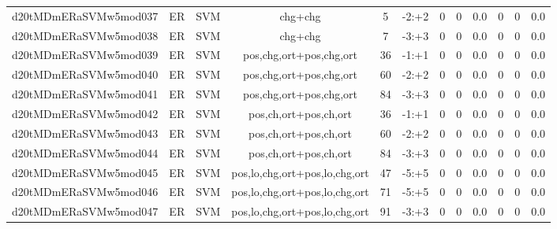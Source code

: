 \documentclass[a4paper]{article}
\begin{document}
\begin{landscape}
\begin{center}
\begin{tabular}{ |c|c|c|c|c|c|c|c|c|c|c|c|}
 
 	
 	\small{ d20tMDmERaSVMw5mod037 } & ER & SVM & chg+chg  &  5 &  -2:+2  &  0 & 0 & 0.0  &  0 & 0 & 0.0 \\
 	

 
 	
 	\small{ d20tMDmERaSVMw5mod038 } & ER & SVM & chg+chg  &  7 &  -3:+3  &  0 & 0 & 0.0  &  0 & 0 & 0.0 \\
 	

 
 	
 	\small{ d20tMDmERaSVMw5mod039 } & ER & SVM & pos,chg,ort+pos,chg,ort  &  36 &  -1:+1  &  0 & 0 & 0.0  &  0 & 0 & 0.0 \\
 	

 
 	
 	\small{ d20tMDmERaSVMw5mod040 } & ER & SVM & pos,chg,ort+pos,chg,ort  &  60 &  -2:+2  &  0 & 0 & 0.0  &  0 & 0 & 0.0 \\
 	

 
 	
 	\small{ d20tMDmERaSVMw5mod041 } & ER & SVM & pos,chg,ort+pos,chg,ort  &  84 &  -3:+3  &  0 & 0 & 0.0  &  0 & 0 & 0.0 \\
 	

 
 	
 	\small{ d20tMDmERaSVMw5mod042 } & ER & SVM & pos,ch,ort+pos,ch,ort  &  36 &  -1:+1  &  0 & 0 & 0.0  &  0 & 0 & 0.0 \\
 	

 
 	
 	\small{ d20tMDmERaSVMw5mod043 } & ER & SVM & pos,ch,ort+pos,ch,ort  &  60 &  -2:+2  &  0 & 0 & 0.0  &  0 & 0 & 0.0 \\
 	

 
 	
 	\small{ d20tMDmERaSVMw5mod044 } & ER & SVM & pos,ch,ort+pos,ch,ort  &  84 &  -3:+3  &  0 & 0 & 0.0  &  0 & 0 & 0.0 \\
 	

 
 	
 	\small{ d20tMDmERaSVMw5mod045 } & ER & SVM & pos,lo,chg,ort+pos,lo,chg,ort  &  47 &  -5:+5  &  0 & 0 & 0.0  &  0 & 0 & 0.0 \\
 	

 
 	
 	\small{ d20tMDmERaSVMw5mod046 } & ER & SVM & pos,lo,chg,ort+pos,lo,chg,ort  &  71 &  -5:+5  &  0 & 0 & 0.0  &  0 & 0 & 0.0 \\
 	

 
 	
 	\small{ d20tMDmERaSVMw5mod047 } & ER & SVM & pos,lo,chg,ort+pos,lo,chg,ort  &  91 &  -3:+3  &  0 & 0 & 0.0  &  0 & 0 & 0.0 \\
 	


\end{tabular}
\end{center}
\end{landscape}
\end{document}
